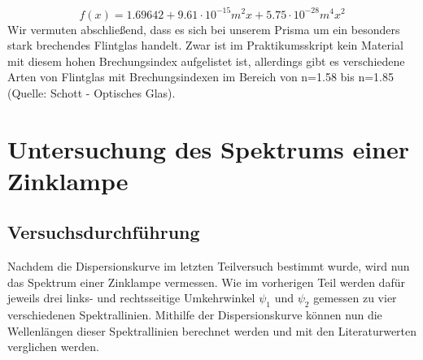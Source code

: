 \documentclass[12pt,a4paper]{article}
\begin{document}
\begin{equation}\label{eq:fitfunction}
f(x)=1.69642+9.61\cdot10^{-15}m^2x+5.75\cdot10^{-28}m^4x^2
\end{equation}
Wir vermuten abschließend, dass es sich bei unserem Prisma um ein besonders stark brechendes Flintglas handelt. Zwar ist im Praktikumsskript kein Material mit diesem hohen Brechungsindex aufgelistet ist, allerdings gibt es verschiedene Arten von Flintglas mit Brechungsindexen im Bereich von n=1.58 bis n=1.85 (Quelle: Schott - Optisches Glas).\\

\FloatBarrier
\section{Untersuchung des Spektrums einer Zinklampe}
\subsection{Versuchsdurchführung}
Nachdem die Dispersionskurve im letzten Teilversuch bestimmt wurde, wird nun das Spektrum einer Zinklampe vermessen. Wie im vorherigen Teil werden dafür jeweils drei links- und rechtsseitige Umkehrwinkel $\psi_1$ und $\psi_2$ gemessen zu vier verschiedenen Spektrallinien. Mithilfe der Dispersionskurve können nun die Wellenlängen dieser Spektrallinien berechnet werden und mit den Literaturwerten verglichen werden.
\end{document}
